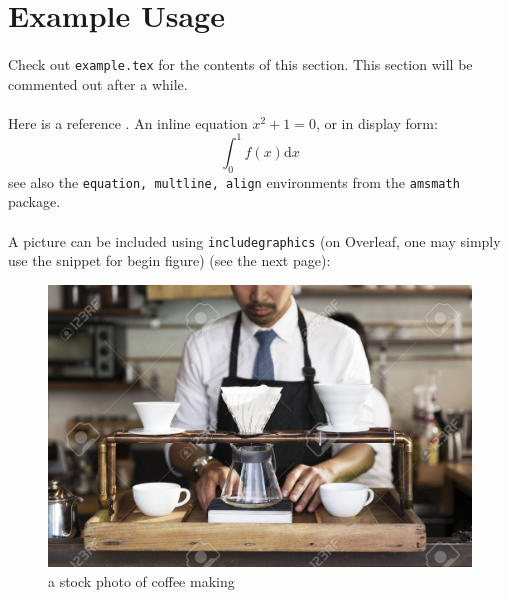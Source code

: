 \section{Example Usage}
\paragraph{}Check out \texttt{example.tex} for the contents of this section. This section will be commented out after a while.
\paragraph{}Here is a reference \cite{example2024}. An inline equation $x^2+1=0$, or in display form:
\[\int_0^1 f(x)\mathrm{d}x\]
see also the \texttt{equation, multline, align} environments from the \texttt{amsmath} package.
\paragraph{}A picture can be included using \texttt{includegraphics} (on Overleaf, one may simply use the snippet for begin figure) (see the next page):
\begin{center}
\begin{figure}
    \centering
    \includegraphics[scale=1]{media/coffee.jpg}
    \caption{a stock photo of coffee making}
    \label{fig:example}
\end{figure}
\end{center}
